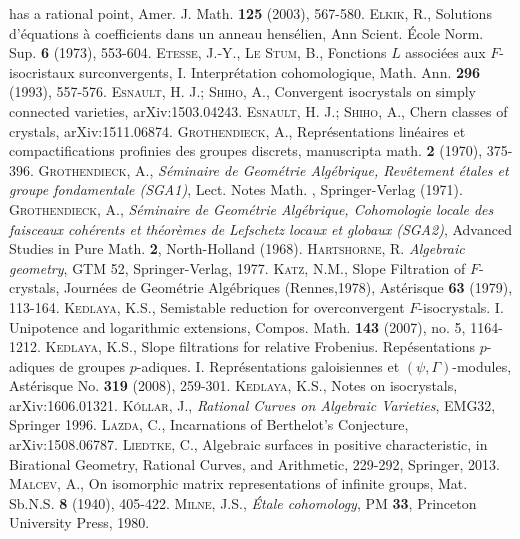 \documentclass[11pt]{amsart}
\begin{document}
\begin{thebibliography}{99}
has a rational point,  Amer. J. Math. \textbf{125} (2003), 567-580.
 \textsc{Elkik, R.}, Solutions d'\'equations \`a coefficients dans un anneau 
hens\'elien, Ann Scient. \'Ecole Norm. Sup. {\bf 6} (1973), 553-604.
 \textsc{Etesse, J.-Y., Le Stum, B.}, Fonctions $L$ associ\'ees aux $F$-isocristaux surconvergents, I. 
Interpr\'etation cohomologique, Math. Ann. \textbf{296} (1993), 557-576.
 \textsc{Esnault, H. J.; Shiho, A.},  Convergent isocrystals on simply connected varieties, arXiv:1503.04243.
 \textsc{Esnault, H. J.; Shiho, A.},  Chern classes of crystals, arXiv:1511.06874.
 \textsc{Grothendieck, A.}, 
Repr\'esentations lin\'eaires et compactifications profinies des groupes discrets, manuscripta math. \textbf{2} (1970), 375-396.
 \textsc{Grothendieck, A.}, 
{\it S\'eminaire de Geom\'etrie Alg\'ebrique, Rev\^etement \'etales et groupe fondamentale (SGA1)}, 
Lect. Notes Math. , Springer-Verlag (1971).
 \textsc{Grothendieck, A.}, 
{\it S\'eminaire de Geom\'etrie Alg\'ebrique, Cohomologie locale des faisceaux coh\'erents et th\'eor\`emes de Lefschetz locaux 
et globaux (SGA2)}, Advanced Studies in Pure Math. \textbf{2}, North-Holland (1968). 
 \textsc{Hartshorne, R.} {\it Algebraic geometry}, GTM 52, Springer-Verlag, 1977.
 \textsc{Katz, N.M.}, Slope Filtration of $F$-crystals, Journ\'ees de Geom\'etrie Alg\'ebriques (Rennes,1978), 
Ast\'erisque \textbf{63} (1979), 113-164. 
 \textsc{Kedlaya, K.S.}, Semistable reduction for overconvergent $F$-isocrystals. I. 
Unipotence and logarithmic extensions, Compos. Math. \textbf{143} (2007), no. 5, 1164-1212. 
 \textsc{Kedlaya, K.S.}, Slope filtrations for relative Frobenius.  
Rep\'esentations $p$-adiques de groupes $p$-adiques. I. 
Repr\'esentations galoisiennes et $(\psi, \Gamma)$-modules, Ast\'erisque No. \textbf{319} (2008), 259-301. 
 \textsc{Kedlaya, K.S.}, Notes on isocrystals, arXiv:1606.01321. 
 \textsc{K\'ollar, J.}, {\it Rational Curves on Algebraic Varieties}, EMG32, Springer 1996.
 \textsc{Lazda, C.}, Incarnations of Berthelot's Conjecture,  arXiv:1508.06787. 
 \textsc{Liedtke, C.}, Algebraic surfaces in positive characteristic, 
in Birational Geometry, Rational Curves, and Arithmetic, 229-292, Springer, 2013.
 \textsc{Malcev, A.}, On isomorphic matrix representations of infinite groups, Mat. Sb.N.S. \textbf{8} 
(1940), 405-422.
 \textsc{Milne, J.S.}, {\it \'Etale cohomology}, PM \textbf{33}, Princeton University Press, 1980.

\end{thebibliography}
\end{document}
